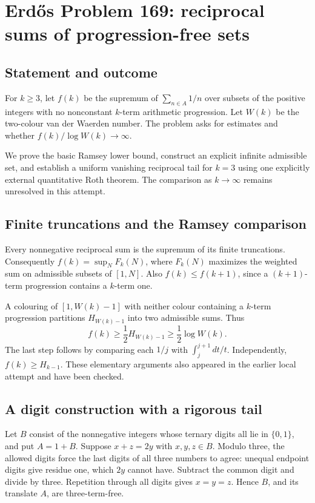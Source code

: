 \section*{Erd\H{o}s Problem 169: reciprocal sums of progression-free sets}
\subsection*{Statement and outcome}
For $k\ge3$, let $f(k)$ be the supremum of $\sum_{n\in A}1/n$ over subsets of the positive integers with no nonconstant $k$-term arithmetic progression. Let $W(k)$ be the two-colour van der Waerden number. The problem asks for estimates and whether $f(k)/\log W(k)\to\infty$.

We prove the basic Ramsey lower bound, construct an explicit infinite admissible set, and establish a uniform vanishing reciprocal tail for $k=3$ using one explicitly external quantitative Roth theorem. The comparison as $k\to\infty$ remains unresolved in this attempt.

\subsection*{Finite truncations and the Ramsey comparison}
Every nonnegative reciprocal sum is the supremum of its finite truncations. Consequently
$f(k)=\sup_N F_k(N)$, where $F_k(N)$ maximizes the weighted sum on admissible subsets of $[1,N]$. Also $f(k)\le f(k+1)$, since a $(k+1)$-term progression contains a $k$-term one.

A colouring of $[1,W(k)-1]$ with neither colour containing a $k$-term progression partitions $H_{W(k)-1}$ into two admissible sums. Thus
\[
 f(k)\ge \frac12H_{W(k)-1}\ge\frac12\log W(k).
 \tag{1}
\]
The last step follows by comparing each $1/j$ with
$\int_j^{j+1}dt/t$. Independently, $f(k)\ge H_{k-1}$.
These elementary arguments also appeared in the earlier local attempt and have been checked.

\subsection*{A digit construction with a rigorous tail}
Let $B$ consist of the nonnegative integers whose ternary digits all lie in $\{0,1\}$, and put $A=1+B$. Suppose $x+z=2y$ with $x,y,z\in B$. Modulo three, the allowed digits force the last digits of all three numbers to agree: unequal endpoint digits give residue one, which $2y$ cannot have. Subtract the common digit and divide by three. Repetition through all digits gives $x=y=z$. Hence $B$, and its translate $A$, are three-term-free.

